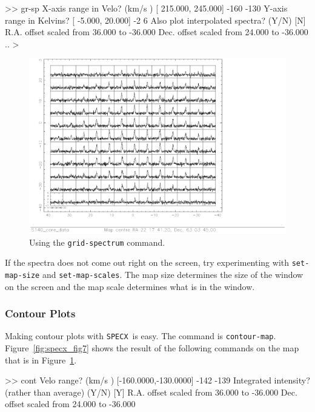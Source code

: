 \documentclass[11pt,twoside]{starlink}
\providecommand{\SPECX}{\texttt{SPECX}}
\begin{document}
\begin{terminalv}
>> gr-sp
X-axis range in Velo? (km/s  ) [  215.000,  245.000] -160 -130
Y-axis range in Kelvins? [   -5.000,   20.000] -2 6
Also plot interpolated spectra? (Y/N) [N]
R.A. offset scaled from   36.000 to  -36.000
Dec. offset scaled from   24.000 to  -36.000
..
>
\end{terminalv}

\begin{figure}[htb]
\centering
\includegraphics[width=\textwidth]{sc8_gr_sp}
\caption[`Postage-stamp' (grid) spectrum plot]
{\small{Using the \texttt{grid-spectrum} command.}
}
\label{fig:specx_fig6}
\end{figure}

If the spectra does not come out right on the screen, try
experimenting with \texttt{set-map-size} and \texttt{set-map-scales}.  The
map size determines the size of the window on the screen and the map
scale determines what is in the window.

\subsubsection{Contour Plots}
\label{sec:specx_13.4}
Making contour plots with \SPECX\ is easy.  The command is \texttt{contour-map}.  Figure~\ref{fig:specx_fig7} shows the result of the
following commands on the map that is in Figure~\ref{fig:specx_fig6}.

\begin{terminalv}
>> cont
Velo range? (km/s  ) [-160.0000,-130.0000] -142 -139
Integrated intensity? (rather than average) (Y/N) [Y]
R.A. offset scaled from   36.000 to  -36.000
Dec. offset scaled from   24.000 to  -36.000
\end{terminalv}
\end{document}
